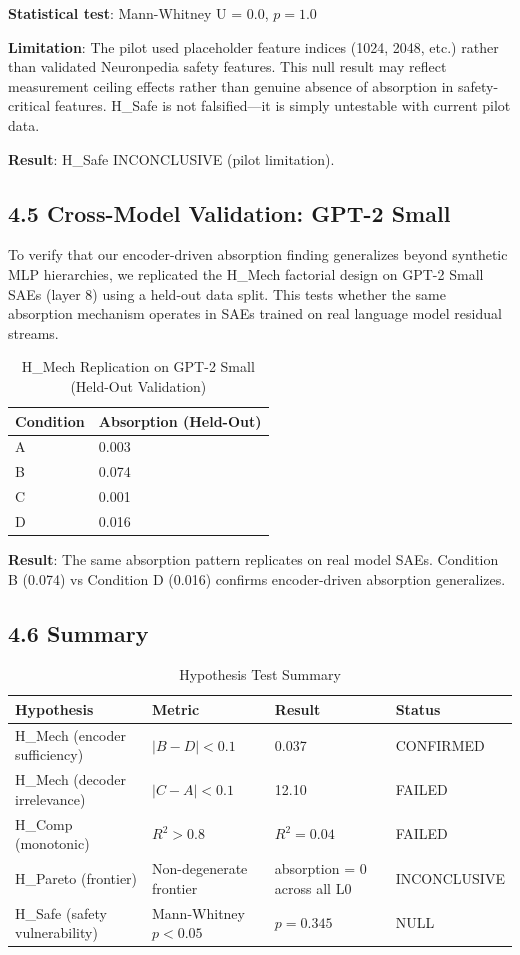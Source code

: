 \documentclass{article}
\begin{document}
\textbf{Statistical test}: Mann-Whitney U = 0.0, $p = 1.0$

\textbf{Limitation}: The pilot used placeholder feature indices (1024, 2048, etc.) rather than validated Neuronpedia safety features. This null result may reflect measurement ceiling effects rather than genuine absence of absorption in safety-critical features. H\_Safe is not falsified---it is simply untestable with current pilot data.

\textbf{Result}: H\_Safe INCONCLUSIVE (pilot limitation).

\subsection{4.5 Cross-Model Validation: GPT-2 Small}

To verify that our encoder-driven absorption finding generalizes beyond synthetic MLP hierarchies, we replicated the H\_Mech factorial design on GPT-2 Small SAEs (layer 8) using a held-out data split. This tests whether the same absorption mechanism operates in SAEs trained on real language model residual streams.

\begin{table}[h]
\centering
\caption{H\_Mech Replication on GPT-2 Small (Held-Out Validation)}
\label{tab:gpt2_validation}
\begin{tabular}{ll}
\toprule
Condition & Absorption (Held-Out) \\
\midrule
A & 0.003 \\
B & 0.074 \\
C & 0.001 \\
D & 0.016 \\
\bottomrule
\end{tabular}
\end{table}

\textbf{Result}: The same absorption pattern replicates on real model SAEs. Condition B (0.074) vs Condition D (0.016) confirms encoder-driven absorption generalizes.

\subsection{4.6 Summary}

\begin{table}[h]
\centering
\caption{Hypothesis Test Summary}
\label{tab:summary}
\begin{tabular}{llll}
\toprule
Hypothesis & Metric & Result & Status \\
\midrule
H\_Mech (encoder sufficiency) & $|B-D| < 0.1$ & 0.037 & CONFIRMED \\
H\_Mech (decoder irrelevance) & $|C-A| < 0.1$ & 12.10 & FAILED \\
H\_Comp (monotonic) & $R^2 > 0.8$ & $R^2 = 0.04$ & FAILED \\
H\_Pareto (frontier) & Non-degenerate frontier & absorption = 0 across all L0 & INCONCLUSIVE \\
H\_Safe (safety vulnerability) & Mann-Whitney $p < 0.05$ & $p = 0.345$ & NULL \\
\bottomrule
\end{tabular}
\end{table}
\end{document}

